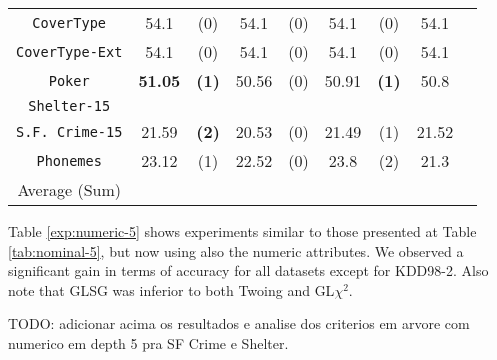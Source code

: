 \begin{table*}
\begin{tabular}{c|cc|cc|cc|cc}
{\tt CoverType}    &54.1        & (0)       & 54.1        & (0)       & 54.1        & (0)       & 54.1        &           \\
{\tt CoverType-Ext}&54.1        & (0)       & 54.1        & (0)       & 54.1        & (0)       & 54.1        &           \\
{\tt Poker}        &{\bf 51.05} & {\bf (1)} & 50.56       & (0)       & 50.91       & {\bf (1)} & 50.8        &           \\  
{\tt Shelter-15}   &            &           &             &           &             &           &             &           \\   
{\tt S.F. Crime-15}& 21.59      & {\bf (2)} & 20.53       & (0)       & 21.49       & (1)       & 21.52       &           \\ 
{\tt Phonemes}     & 23.12      & (1)       & 22.52       & (0)       & 23.8        & (2)       & 21.3        &           \\ 
\hline
Average (Sum)      &            &           &             &           &             &           &             & 
       \end{tabular}
\end{table*}


Table \ref{exp:numeric-5} shows experiments  similar to those presented at Table \ref{tab:nominal-5}, but now
using also the numeric attributes. We observed a significant gain in terms of accuracy for all datasets except for KDD98-2. 
Also note that GLSG was inferior to both Twoing and GL$\chi^2$.

TODO: adicionar acima os resultados e analise dos criterios em arvore com numerico em depth 5 pra SF Crime e Shelter.

